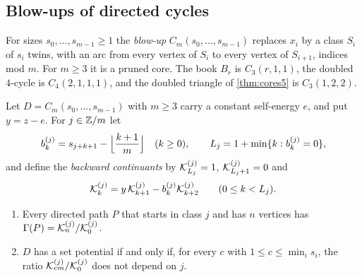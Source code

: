 \subsection{Blow-ups of directed cycles}
For sizes $s_0,\dots,s_{m-1}\ge1$ the \emph{blow-up} $C_m(s_0,\dots,s_{m-1})$ replaces $x_i$ by a class $S_i$ of $s_i$ twins, with an arc from every vertex of $S_i$ to every vertex of $S_{i+1}$, indices mod $m$. For $m\ge3$ it is a pruned core. The book $B_r$ is $C_3(r,1,1)$, the doubled $4$-cycle is $C_4(2,1,1,1)$, and the doubled triangle of \cref{thm:cores5} is $C_3(1,2,2)$.

\begin{theorem}\label{thm:blowup-criterion}
Let $D=C_m(s_0,\dots,s_{m-1})$ with $m\ge3$ carry a constant self-energy $e$, and put $y=z-e$. For $j\in\mathbb{Z}/m$ let
\[
b^{(j)}_k=s_{j+k+1}-\Bigl\lfloor\frac{k+1}{m}\Bigr\rfloor\quad(k\ge0),\qquad L_j=1+\min\{k:b^{(j)}_k=0\},
\]
and define the \emph{backward continuants} by $\mathcal{K}^{(j)}_{L_j}=1$, $\mathcal{K}^{(j)}_{L_j+1}=0$ and
\[
\mathcal{K}^{(j)}_k=y\,\mathcal{K}^{(j)}_{k+1}-b^{(j)}_k\mathcal{K}^{(j)}_{k+2}\qquad(0\le k<L_j).
\]
\begin{enumerate}[label=\textup{(\arabic*)}]
\item Every directed path $P$ that starts in class $j$ and has $n$ vertices has $\Gamma(P)=\mathcal{K}^{(j)}_n/\mathcal{K}^{(j)}_0$.
\item $D$ has a set potential if and only if, for every $c$ with $1\le c\le\min_is_i$, the ratio $\mathcal{K}^{(j)}_{cm}/\mathcal{K}^{(j)}_0$ does not depend on $j$.
\end{enumerate}
\end{theorem}
